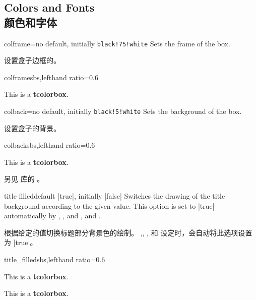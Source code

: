 \subsection{Colors and Fonts\\颜色和字体}

\begin{docTcbKey}{colframe}{=}{no default, initially \texttt{black!75!white}}
Sets the frame  of the box.

设置盒子边框的。
\begin{exdispExample*}{colframe}{sbs,lefthand ratio=0.6}
\begin{tcolorbox}[colframe=red!50!white]
This is a \textbf{tcolorbox}.
\end{tcolorbox}
\end{exdispExample*}
\end{docTcbKey}

\begin{docTcbKey}{colback}{=}{no default, initially \texttt{black!5!white}}
Sets the background  of the box.

设置盒子的背景。
\begin{exdispExample*}{colback}{sbs,lefthand ratio=0.6}
\begin{tcolorbox}[colback=red!50!white]
This is a \textbf{tcolorbox}.
\end{tcolorbox}
\end{exdispExample*}
\end{docTcbKey}

另见  库的 。

\begin{docTcbKey}{title filled}{}{default |true|, initially |false|}
Switches the drawing of the title background according to the given value.
This option is set to |true| automatically by ,
, and ,
and .

根据给定的值切换标题部分背景色的绘制。
,, ,
和  设定时，会自动将此选项设置为 |true|。

\begin{exdispExample*}{title_filled}{sbs,lefthand ratio=0.6}
\begin{tcolorbox}[title=My title,title filled]
This is a \textbf{tcolorbox}.
\end{tcolorbox}
\begin{tcolorbox}[title=My title,
title filled=false]
This is a \textbf{tcolorbox}.
\end{tcolorbox}
\end{exdispExample*}
\end{docTcbKey}



